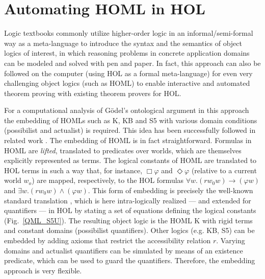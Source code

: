 \documentclass{article}
\newcommand{\imp}{{\rightarrow}}
\begin{document}








\section{Automating HOML in HOL}\label{sec:homlinhol}

Logic textbooks %
commonly utilize higher-order logic in an informal/semi-formal way as
a meta-language to introduce the syntax and the semantics of object
logics of interest, in which reasoning problems in concrete
application domains can be modeled and solved with pen and paper. In
fact, this approach can also be followed on the computer (using HOL as
a formal meta-language) for even very challenging object logics (such
as HOML) to enable interactive and automated theorem proving with
existing theorem provers for HOL.


For a computational analysis of G\"odel's ontological argument in this
approach the embedding of HOMLs such as K,
KB and S5 with various domain conditions (possibilist and actualist)
is required. This idea has been successfully followed in related work
\cite{C40}. The embedding of HOML is in fact
straightforward. Formulas in HOML are \emph{lifted}, translated to predicates
over worlds, which are themselves explicitly represented as
terms. The logical constants of HOML are translated to HOL terms in such a way that, for instance, 
$\Box \varphi$ and $\Diamond \varphi$ (relative to a current world
$w_o$) are mapped, respectively, to the HOL formulas
$\forall w. (r w_0 w) \imp (\varphi w)$ and
$\exists w. (r w_0 w) \wedge (\varphi w)$. This form of embedding is
precisely the well-known standard translation
\cite{DBLP:journals/logcom/Ohlbach91}, which is here intra-logically
realized --- and extended for quantifiers --- in HOL by stating a set
of equations defining the logical constants (Fig.~\ref{QML_S5U}). The
resulting object logic is the HOML K with rigid terms and constant
domains (possibilist quantifiers). Other logics (e.g. KB, S5) can be
embedded by adding axioms that restrict the accessibility relation
$r$. Varying domains and actualist quantifiers can be simulated by
means of an existence predicate, which can be used to guard the
quantifiers. Therefore, the embedding approach is very flexible.
\end{document}
